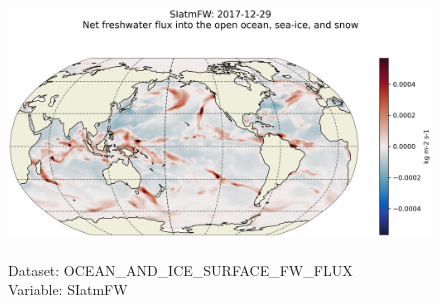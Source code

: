 \begin{figure}[H]
\centering
\includegraphics[scale=0.5]{../images/plots/latlon_plots/Ocean_and_Sea-Ice_Surface_Freshwater_Fluxes/SIatmFW.png}
\caption{\\Dataset: OCEAN\_AND\_ICE\_SURFACE\_FW\_FLUX\\Variable: SIatmFW}
\label{tab:table-OCEAN_AND_ICE_SURFACE_FW_FLUX_SIatmFW-Plot}
\end{figure}
\pagebreak
